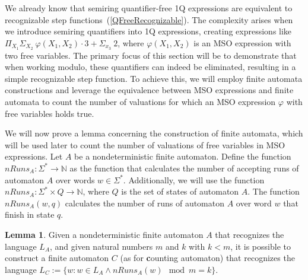 \documentclass[12pt]{article}
\theoremstyle{definition}
\newtheorem{lemma}[theorem]{Lemma}
\begin{document}
We already know that semiring quantifier-free 1Q expressions are equivalent to recognizable step functions~(\cref{QFreeRecognizable}). The complexity arises when we introduce semiring quantifiers into 1Q expressions, creating expressions like $\Pi_{X_1} \Sigma_{X_2} \ \varphi(X_1, X_2) \cdot 3 + \Sigma_{x_3} \ 2$, where $\varphi(X_1, X_2)$ is an MSO expression with two free variables. The primary focus of this section will be to demonstrate that when working modulo, these quantifiers can indeed be eliminated, resulting in a simple recognizable step function. To achieve this, we will employ finite automata constructions and leverage the equivalence between MSO expressions and finite automata to count the number of valuations for which an MSO expression $\varphi$ with free variables holds true.

We will now prove a lemma concerning the construction of finite automata, which will be used later to count the number of valuations of free variables in MSO expressions. Let $A$ be a nondeterministic finite automaton. Define the function $nRuns_A : \Sigma^* \rightarrow \mathbb{N}$ as the function that calculates the number of accepting runs of automaton $A$ over words $w \in \Sigma^*$. Additionally, we will use the function $nRuns_A : \Sigma^* \times Q \rightarrow \mathbb{N}$, where $Q$ is the set of states of automaton $A$. The function $nRuns_A(w, q)$ calculates the number of runs of automaton $A$ over word $w$ that finish in state $q$.

\begin{lemma}
    \label{CountRunsAutomaton}
    Given a nondeterministic finite automaton $A$ that recognizes the language $L_A$, and given natural numbers $m$ and $k$ with $k < m$, it is possible to construct a finite automaton $C$ (as for \textbf{c}ounting automaton) that recognizes the language $L_{C} := \{ w : w \in L_A \land nRuns_A(w) \mod m = k \}$.
\end{lemma}
\end{document}
